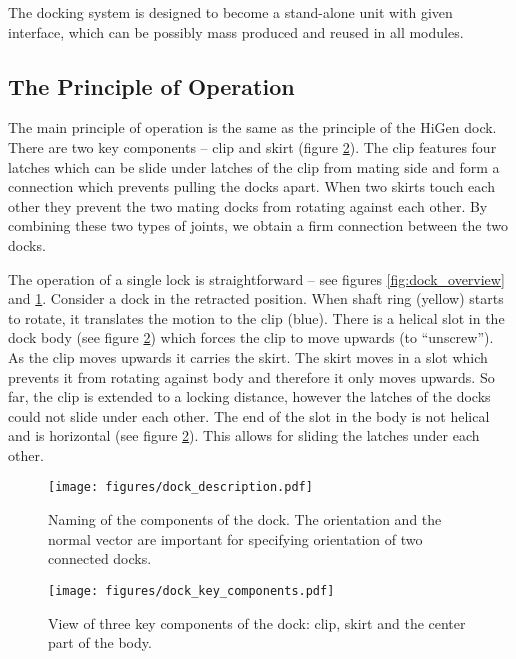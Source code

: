 The docking system is designed to become a stand-alone unit with given
interface, which can be possibly mass produced and reused in all modules.

\subsection{The Principle of Operation}

The main principle of operation is the same as the principle of the HiGen dock.
There are two key components -- clip and skirt (figure
\ref{fig:dock_key_components}). The clip features four latches which can be
slide under latches of the clip from mating side and form a connection which
prevents pulling the docks apart. When two skirts touch each other they prevent
the two mating docks from rotating against each other. By combining these two
types of joints, we obtain a firm connection between the two docks.

The operation of a single lock is straightforward -- see figures
\ref{fig:dock_overview} and \ref{fig:dock_description}. Consider a dock in the
retracted position. When shaft ring (yellow) starts to rotate, it translates the
motion to the clip (blue). There is a helical slot in the dock body (see figure
\ref{fig:dock_key_components}) which forces the clip to move upwards (to
``unscrew''). As the clip moves upwards it carries the skirt. The skirt moves in a
slot which prevents it from rotating against body and therefore it only moves
upwards. So far, the clip is extended to a locking distance, however the latches
of the docks could not slide under each other. The end of the slot in the body
is not helical and is horizontal (see figure \ref{fig:dock_key_components}).
This allows for sliding the latches under each other.

\begin{figure}[h!]
    \centering
    \texttt{[image: figures/dock\_description.pdf]}
    \caption{Naming of the components of the dock. The orientation and the
    normal vector are important for specifying orientation of two connected
    docks. }
    \label{fig:dock_description}
\end{figure}

\begin{figure}[h!]
    \centering
    \texttt{[image: figures/dock\_key\_components.pdf]}
    \caption{View of three key components of the dock: clip, skirt and the
    center part of the body.}
    \label{fig:dock_key_components}
\end{figure}

